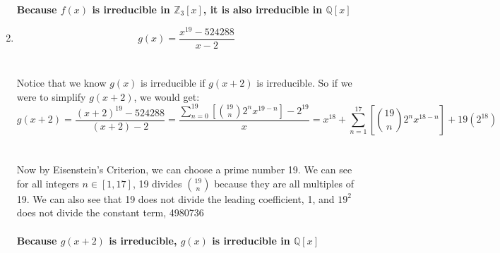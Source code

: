 \documentclass[12pt]{article}
\begin{document}
\begin{enumerate}[label = (\alph*)]
		\textbf{\boldmath Because $f(x)$ is irreducible in $\mathbb{Z}_3[x]$, it is also irreducible in $\mathbb{Q}[x]$}
		\newpage
		\item $$g(x) = \frac{x^{19} - 524288}{x-2}$$
		\\ \\
		Notice that we know $g(x)$ is irreducible if $g(x+2)$ is irreducible.  So if we were to simplify $g(x+2)$, we would get: 
			$$
			g(x+2) = \frac{(x+2)^{19} - 524288}{(x+2) - 2} = \frac{\sum_{n=0}^{19}\left[  \binom{19}{n} 2^{n}x^{19-n}\right]  - 2^{19}}{x} = x^{18} + \sum_{n=1}^{17}\left[  \binom{19}{n} 2^{n}x^{18-n}\right]  + 19(2^{18})
			$$
		\\ \\
		Now by Eisenstein's Criterion, we can choose a prime number 19.  We can see for all integers $n \in [1,17]$, 19 divides $\binom{19}{n}$ because they are all multiples of 19.  We can also see that 19 does not divide the leading coefficient, 1, and $19^2$ does not divide the constant term, 4980736
		\\ \\
		\textbf{\boldmath Because $g(x+2)$ is irreducible, $g(x)$ is irreducible in $\mathbb{Q}[x]$}
	\end{enumerate}

\newpage
\end{document}
